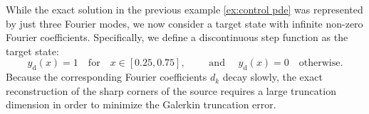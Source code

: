 \documentclass[12pt]{amsart}
\numberwithin{equation}{section}
\begin{document}
While the exact solution in the previous example \eqref{ex:control pde} was represented by just three Fourier modes, we now consider a target state with infinite non-zero Fourier coefficients. Specifically, we define a discontinuous step function as the target state:
\[
y_{\text{d}}(x) = 1 \quad \text{for}\quad x \in [0.25, 0.75], \qquad \text{ and }\quad  y_{\text{d}}(x) = 0 \quad \text{otherwise.}
\]
Because the corresponding Fourier coefficients $d_k$ decay slowly, the exact reconstruction of the sharp corners of the source requires a large truncation dimension in order to minimize the Galerkin truncation error.


    
\end{document}
